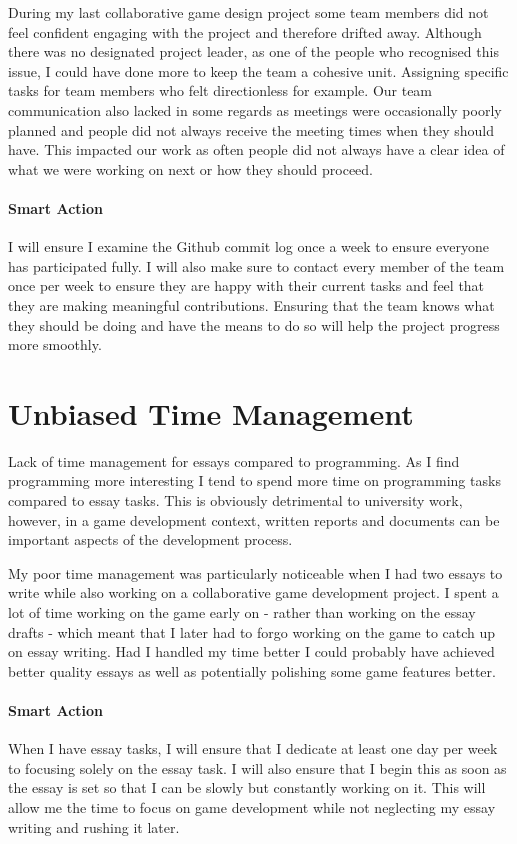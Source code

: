 \documentclass{scrartcl}
\begin{document}
During my last collaborative game design project some team members did not feel confident engaging with the project and therefore drifted away. Although there was no designated project leader, as one of the people who recognised this issue, I could have done more to keep the team a cohesive unit. Assigning specific tasks for team members who felt directionless for example. Our team communication also lacked in some regards as meetings were occasionally poorly planned and people did not always receive the meeting times when they should have. This impacted our work as often people did not always have a clear idea of what we were working on next or how they should proceed.

\paragraph{Smart Action} I will ensure I examine the Github commit log once a week to ensure everyone has participated fully. I will also make sure to contact every member of the team once per week to ensure they are happy with their current tasks and feel that they are making meaningful contributions. Ensuring that the team knows what they should be doing and have the means to do so will help the project progress more smoothly.


\section{Unbiased Time Management}

Lack of time management for essays compared to programming. As I find programming more interesting I tend to spend more time on programming tasks compared to essay tasks. This is obviously detrimental to university work, however, in a game development context, written reports and documents can be important aspects of the development process.

My poor time management was particularly noticeable when I had two essays to write while also working on a collaborative game development project. I spent a lot of time working on the game early on - rather than working on the essay drafts - which meant that I later had to forgo working on the game to catch up on essay writing. Had I handled my time better I could probably have achieved better quality essays as well as potentially polishing some game features better.

\paragraph{Smart Action} When I have essay tasks, I will ensure that I dedicate at least one day per week to focusing solely on the essay task. I will also ensure that I begin this as soon as the essay is set so that I can be slowly but constantly working on it. This will allow me the time to focus on game development while not neglecting my essay writing and rushing it later.
\end{document}
